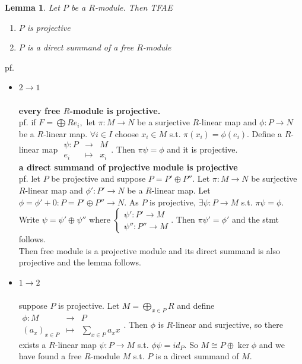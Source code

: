 \documentclass[12pt,letterpaper]{report}
\newtheorem{lemma}{Lemma}[section]
\begin{document}
\begin{lemma}Let $P$ be a $R$-module. Then TFAE\begin{enumerate}\item $P$ is projective \item $P$ is a direct summand of a free $R$-module\end{enumerate}\end{lemma}
pf. \begin{itemize}\item $2\rightarrow 1$
\\\\\textbf{every free $R$-module is projective.}
\\pf. if $F=\bigoplus Re_{i},$ let $\pi:M\rightarrow N$ be a surjective $R$-linear map and $\phi:P\rightarrow N$ be a $R$-linear map. $\forall i\in I$ choose $x_{i}\in M$ s.t. $\pi(x_{i})=\phi(e_{i})$. Define a $R$-linear map $\begin{array}{rrr}\psi:P&\rightarrow&M\\e_{i}&\mapsto&x_{i}\end{array}$. Then $\pi\psi=\phi$ and it is projective.
\\\textbf{a direct summand of projective module is projective}
\\pf. let $P$ be projective and suppose $P=P'\oplus P''$. Let $\pi:M\rightarrow N$ be surjective $R$-linear map and $\phi':P'\rightarrow N$ be a $R$-linear map. Let $\phi=\phi'+0:P=P'\oplus P''\rightarrow N$. As $P$ is projective, $\exists \psi:P\rightarrow M$ s.t. $\pi\psi=\phi$. Write $\psi=\psi'\oplus\psi''$ where $\left\{\begin{array}{r}\psi':P'\rightarrow M\\\psi'':P''\rightarrow M\end{array}\right.$. Then $\pi\psi'=\phi'$ and the stmt follows.
\\Then free module is a projective module and its direct summand is also projective and the lemma follows.


\item $1\rightarrow 2$
\\\\suppose $P$ is projective. Let $M=\bigoplus_{x\in P}R$ and define $\begin{array}{rrr}\phi:M&\rightarrow& P\\(a_{x})_{x\in P}&\mapsto&\sum_{x\in P}a_{x}x\end{array}$. Then $\phi$ is $R$-linear and surjective, so there exists a $R$-linear map $\psi:P\rightarrow M$ s.t. $\phi\psi=id_{P}$. So $M\cong P\oplus \ker\phi$ and we have found a free $R$-module $M$ s.t. $P$ is a direct summand of $M$.

\end{itemize}
\end{document}
